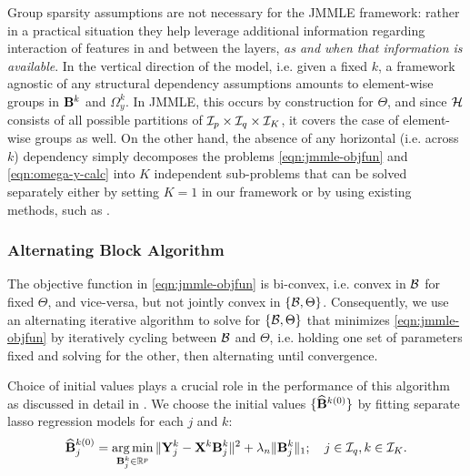 {\colb 
\begin{Remark}
Group sparsity assumptions are not necessary for the JMMLE framework: rather in a practical situation they help leverage additional information regarding interaction of features in and between the layers, {\it as and when that information is available}. In the vertical direction of the model, i.e. given a fixed $k$, a framework agnostic of any structural dependency assumptions amounts to element-wise groups in ${\mathbf{B}}^k$ and $\Omega_y^k$. In JMMLE, this occurs by construction for $\Theta$, and since ${\cal{H}}$ consists of all possible partitions of ${\cal{I}}_p \times {\cal{I}}_q \times {\cal{I}}_K$, it covers the case of element-wise groups as well. On the other hand, the absence of any horizontal (i.e. across $k$) dependency simply decomposes the problems \eqref{eqn:jmmle-objfun} and \eqref{eqn:omega-y-calc} into $K$ independent sub-problems that can be solved separately either by setting $K=1$ in our framework or by using existing methods, such as \citet{LinEtal16}.
\end{Remark}
}

\subsubsection{Alternating Block Algorithm}
The objective function in \eqref{eqn:jmmle-objfun} is bi-convex, i.e. convex in ${\cal{B}}$ for fixed $\Theta$, and vice-versa, but not jointly convex in $\{ {\cal{B}}, \Theta \}$. Consequently, we use an alternating iterative algorithm to solve for $\{ {\cal{B}}, \Theta \}$ that minimizes \eqref{eqn:jmmle-objfun} by iteratively cycling between ${\cal{B}}$ and $\Theta$, i.e. holding one set of parameters fixed and solving for the other, then alternating until convergence.

Choice of initial values plays a crucial role in the performance of this algorithm as discussed in detail in
\citet{LinEtal16}. 
%
%
We choose the initial values $\{ \widehat {{\mathbf{B}}}^{k (0)} \}$ by fitting separate lasso regression models for each $j$ and $k$:
%
\begin{align}\label{eqn:init-B}
\widehat {{\mathbf{B}}}_j^{k (0)} = \operatorname*{arg\,min}_{{\mathbf{B}}_j^k \in {\mathbb{R}}^p} \|{\mathbf{Y}}_j^k - {\mathbf{X}}^k {\mathbf{B}}_j^k \|^2 + \lambda_n \| {\mathbf{B}}_j^k \|_1; \quad
j \in {\cal{I}}_q, k \in {\cal{I}}_K.
\end{align}
%

